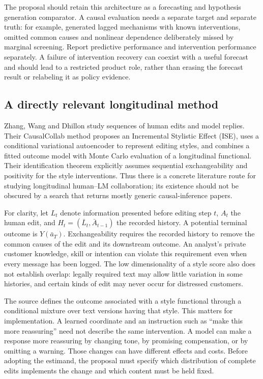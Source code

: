 The proposal should retain this architecture as a forecasting and
hypothesis generation comparator. A causal evaluation needs a separate
target and separate truth: for example, generated lagged mechanisms with
known interventions, omitted common causes and nonlinear dependence
deliberately missed by marginal screening. Report predictive performance
and intervention performance separately. A failure of intervention
recovery can coexist with a useful forecast and should lead to a
restricted product role, rather than erasing the forecast result or
relabeling it as policy evidence.

\hypertarget{a-directly-relevant-longitudinal-method}{%
\subsection{A directly relevant longitudinal
method}\label{a-directly-relevant-longitudinal-method}}

Zhang, Wang and Dhillon study sequences of human edits and model
replies. Their CausalCollab method proposes an Incremental Stylistic
Effect (ISE), uses a conditional variational autoencoder to represent
editing styles, and combines a fitted outcome model with Monte Carlo
evaluation of a longitudinal functional. Their identification theorem
explicitly assumes sequential exchangeability and positivity for the
style interventions. Thus there is a concrete literature route for
studying longitudinal human--LM collaboration; its existence should not
be obscured by a search that returns mostly generic causal-inference
papers. \citep{exec13_census_collaboration}

For clarity, let \(L_t\) denote information presented before editing
step \(t\), \(A_t\) the human edit, and \(H_t=(\bar L_t,\bar A_{t-1})\)
the recorded history. A potential terminal outcome is \(Y(\bar a_T)\).
Exchangeability requires the recorded history to remove the common
causes of the edit and its downstream outcome. An analyst's private
customer knowledge, skill or intention can violate this requirement even
when every message has been logged. The low dimensionality of a style
score also does not establish overlap: legally required text may allow
little variation in some histories, and certain kinds of edit may never
occur for distressed customers.

The source defines the outcome associated with a style functional
through a conditional mixture over text versions having that style. This
matters for implementation. A learned coordinate and an instruction such
as ``make this more reassuring'' need not describe the same
intervention. A model can make a response more reassuring by changing
tone, by promising compensation, or by omitting a warning. Those changes
can have different effects and costs. Before adopting the estimand, the
proposal must specify which distribution of complete edits implements
the change and which content must be held fixed.

